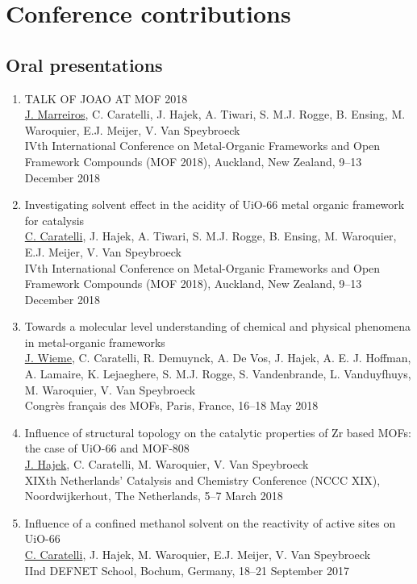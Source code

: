 \section*{Conference contributions}
\subsection*{Oral presentations}

\begin{enumerate}

\item
TALK OF JOAO AT MOF 2018\\
\underline{J. Marreiros}, C. Caratelli, J. Hajek, A. Tiwari, S. M.J. Rogge, B. Ensing, M. Waroquier, E.J. Meijer, V. Van Speybroeck\\
IVth International Conference on Metal-Organic Frameworks and Open Framework Compounds (MOF 2018),
Auckland, New Zealand, 9--13 December 2018

\item
Investigating solvent effect in the acidity of UiO-66 metal organic framework for catalysis\\
\underline{C. Caratelli}, J. Hajek, A. Tiwari, S. M.J. Rogge, B. Ensing, M. Waroquier, E.J. Meijer, V. Van Speybroeck\\
IVth International Conference on Metal-Organic Frameworks and Open Framework Compounds (MOF 2018),
Auckland, New Zealand, 9--13 December 2018

\item
Towards a molecular level understanding of chemical and physical phenomena in metal-organic
frameworks\\
\underline{J. Wieme}, C. Caratelli, R. Demuynck, A. De Vos, J. Hajek, A. E. J. Hoffman, A. Lamaire, K. Lejaeghere, S. M.J. Rogge, S. Vandenbrande, L. Vanduyfhuys, M. Waroquier, V. Van Speybroeck\\
Congrès français des MOFs, Paris, France, 16--18 May 2018

\item
Influence of structural topology on the catalytic properties of Zr based MOFs: the case of UiO-66 and MOF-808\\
\underline{J. Hajek}, C. Caratelli, M. Waroquier, V. Van Speybroeck\\
XIXth Netherlands' Catalysis and Chemistry Conference (NCCC XIX),
Noordwijkerhout, The Netherlands, 5--7 March 2018

\item
Influence of a confined methanol solvent on the reactivity of active sites on UiO-66\\
\underline{C. Caratelli}, J. Hajek, M. Waroquier, E.J. Meijer, V. Van Speybroeck\\
IInd DEFNET School, Bochum, Germany, 18--21 September 2017


\end{enumerate}
